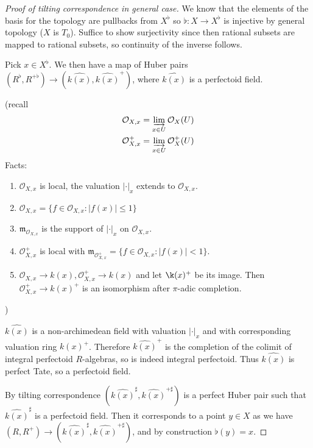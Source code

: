 \documentclass[a4paper]{article}
\newcommand{\tilt}{\flat} %
\newcommand{\sh}[1]{\mathcal{#1}} %
\newcommand{\sh}[1]{\mathcal{#1}} %
\begin{document}
\begin{proof}[Proof of tilting correspondence in general case]
  We know that the elements of the basis for the topology are pullbacks from \(X^\tilt\) so \(\tilt: X \to X^\tilt\) is injective by general topology (\(X\) is \(T_0\)). Suffice to show surjectivity since then rational subsets are mapped to rational subsets, so continuity of the inverse follows.

  Pick \(x \in X^\tilt\). We then have a map of Huber pairs \((R^\tilt, R^{+ \tilt}) \to (\widehat{k(x)}, \widehat{k(x)}^+)\), where \(\widehat{k(x)}\) is a perfectoid field.

  (recall
  \begin{align*}
    \sh O_{X, x} &= \varinjlim_{x \in U} \sh O_X(U) \\
    \sh O_{X, x}^+ &= \varinjlim_{x \in U} \sh O_X^+(U)
  \end{align*}
  Facts:
  \begin{enumerate}
  \item \(\sh O_{X, x}\) is local, the valuation \(|\cdot|_x\) extends to \(\sh O_{X, x}\).
  \item \(\sh O_{X, x} = \{f \in \sh O_{X, x}: |f(x)| \leq 1\}\)
  \item \(\mathfrak m_{\sh O_{X, x}}\) is the support of \(|\cdot|_x\) on \(\sh O_{X, x}\).
  \item \(\sh O_{X, x}^+\) is local with \(\mathfrak m_{\sh O_{X, x}^+} = \{f \in \sh O_{X, x}: |f(x)| < 1\}\).
  \item \(\sh O_{X, x} \to k(x), \sh O_{X, x}^+ \to k(x)\) and let \(\k(x)^+\) be its image. Then \(\sh O_{X, x}^+ \to k(x)^+\) is an isomorphism after \(\pi\)-adic completion.
  \end{enumerate}
  )

  \(\widehat{k(x)}\) is a non-archimedean field with valuation \(|\cdot|_x\) and with corresponding valuation ring \(\widehat{k(x)^+}\). Therefore \(\widehat{k(x)}^+\)  is the completion of the colimit of integral perfectoid \(R\)-algebras, so is indeed integral perfectoid. Thus \(\widehat{k(x)}\) is perfect Tate, so a perfectoid field.

  By tilting correspondence \((\widehat{k(x)}^\sharp, \widehat{k(x)}^{+ \sharp})\) is a perfect Huber pair such that \(\widehat{k(x)}^\sharp\) is a perfectoid field. Then it corresponds to a point \(y \in X\) as we have \((R, R^+) \to (\widehat{k(x)}^\sharp, \widehat{k(x)}^{+ \sharp})\), and by construction \(\tilt(y) = x\).
\end{proof}
\end{document}
